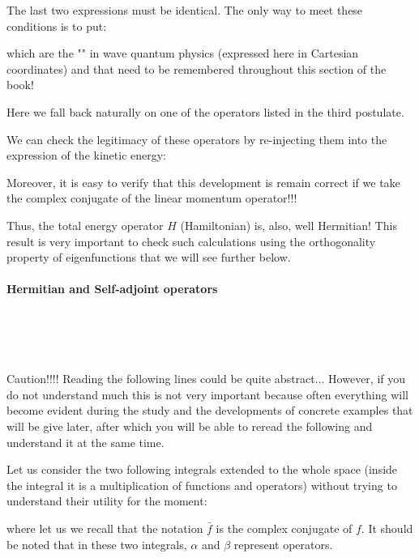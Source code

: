 	The last two expressions must be identical. The only way to meet these conditions is to put:
	
	which are the "" in wave quantum physics (expressed here in Cartesian coordinates) and that need to be remembered throughout this section of the book!
	\begin{tcolorbox}[title=Remark,colframe=black,arc=10pt]
	Here we fall back naturally on one of the operators listed in the third postulate.
	\end{tcolorbox}
	We can check the legitimacy of these operators by re-injecting them into the expression of the kinetic energy:
	
	Moreover, it is easy to verify that this development is remain correct if we take the complex conjugate of the linear momentum operator!!!

	Thus, the total energy operator $H$ (Hamiltonian) is, also, well Hermitian! This result is very important to check such calculations using the orthogonality property of eigenfunctions that we will see further below.
	
	\paragraph{Hermitian and Self-adjoint operators}\mbox{}\\\\\
	
	\begin{tcolorbox}[colback=red!5,borderline={1mm}{2mm}{red!5},arc=0mm,boxrule=0pt]
	\bcbombe Caution!!!! Reading the following lines could be quite abstract... However, if you do not understand much this is not very important because often everything will become evident during the study and the developments of concrete examples that will be give later, after which you will be able to reread the following and understand it at the same time.
	\end{tcolorbox}
	
	Let us consider the two following integrals extended to the whole space (inside the integral it is a multiplication of functions and operators) without trying to understand their utility for the moment:
	
	where let us we recall that the notation $\bar{f}$ is the complex conjugate of $f$. It should be noted that in these two integrals, $\alpha$ and $\beta$ represent operators.
	
